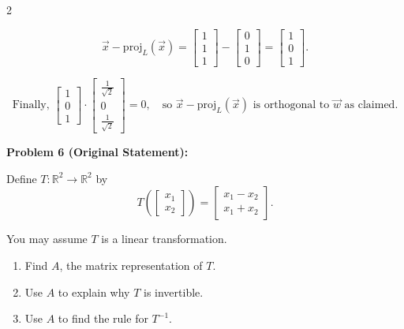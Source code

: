 \documentclass[8pt]{extarticle}
\begin{document}
\begin{multicols}{2}
\begin{tcolorbox}[title=Problem 5 — Original Statement and Solution]
\[
\vec{x} - \mathrm{proj}_{L}(\vec{x})
= \begin{bmatrix}1\\1\\1\end{bmatrix}
- \begin{bmatrix}0\\1\\0\end{bmatrix}
= \begin{bmatrix}1\\0\\1\end{bmatrix}.
\]

\[
\text{Finally, }
\begin{bmatrix}1\\0\\1\end{bmatrix}
\cdot
\begin{bmatrix}\tfrac{1}{\sqrt{2}}\\[4pt]0\\[4pt]\tfrac{1}{\sqrt{2}}\end{bmatrix}
= 0,
\quad\text{so } \vec{x} - \mathrm{proj}_{L}(\vec{x}) \text{ is orthogonal to } \vec{w} \text{ as claimed.}
\]
\end{tcolorbox}

\begin{tcolorbox}[title=Problem 6 — Original Statement and Solution]
\noindent
\textbf{Problem 6 (Original Statement):}  

Define \( T:\mathbb{R}^{2} \to \mathbb{R}^{2} \) by
\[
T\!\left(
\begin{bmatrix} x_{1}\\ x_{2} \end{bmatrix}
\right)
=
\begin{bmatrix}
x_{1} - x_{2}\\
x_{1} + x_{2}
\end{bmatrix}.
\]

You may assume \(T\) is a linear transformation.  
\begin{enumerate}
\item[(a)] Find \( A \), the matrix representation of \(T\).
\item[(b)] Use \(A\) to explain why \(T\) is invertible.
\item[(c)] Use \(A\) to find the rule for \(T^{-1}\).
\end{enumerate}


\end{tcolorbox}
\end{multicols}
\end{document}
